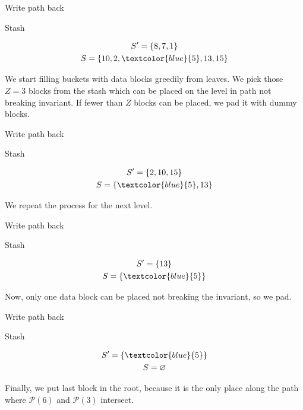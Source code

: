 	\exampleFrame%
		{Write path back}
		{
			\selectedtrue%
			\pathreadtrue%
			\nodeonenewtrue%
		}
		{}
		{
			\begin{block}{Stash}
				
				\begin{gather*}
					S^\prime = \{ 8, 7, 1 \} \\
					S = \{ 10, 2, \textcolor{blue}{5}, 13, 15 \}
				\end{gather*}
	
			\end{block}
		}
		{
			We start filling buckets with data blocks greedily from leaves.
			We pick those $Z = 3$ blocks from the stash which can be placed on the level in path not breaking invariant.
			If fewer than $Z$ blocks can be placed, we pad it with dummy blocks.
		}	

	\exampleFrame%
		{Write path back}
		{
			\selectedtrue%
			\pathreadtrue%
			\nodeonenewtrue%
			\nodetwonewtrue%
		}
		{}
		{
			\begin{block}{Stash}
				
				\begin{gather*}
					S^\prime = \{ 2, 10, 15 \} \\
					S = \{ \textcolor{blue}{5}, 13 \}
				\end{gather*}
	
			\end{block}
		}
		{
			We repeat the process for the next level.
		}	

	\exampleFrame%
		{Write path back}
		{
			\selectedtrue%
			\pathreadtrue%
			\nodeonenewtrue%
			\nodetwonewtrue%
			\nodethreenewtrue%
		}
		{}
		{
			\begin{block}{Stash}
				
				\begin{gather*}
					S^\prime = \{ 13 \} \\
					S = \{ \textcolor{blue}{5} \}
				\end{gather*}
	
			\end{block}
		}
		{
			Now, only one data block can be placed not breaking the invariant, so we pad.
		}	

	\exampleFrame%
		{Write path back}
		{
			\selectedtrue%
			\pathreadtrue%
			\nodeonenewtrue%
			\nodetwonewtrue%
			\nodethreenewtrue%
			\nodefournewtrue%
		}
		{}
		{
			\begin{block}{Stash}
				
				\begin{gather*}
					S^\prime = \{ \textcolor{blue}{5} \} \\
					S = \varnothing
				\end{gather*}
	
			\end{block}
		}
		{
			Finally, we put last block in the root, because it is the only place along the path where $\mathcal{P}(6)$ and $\mathcal{P}(3)$ intersect.
		}
	
